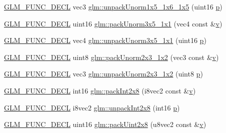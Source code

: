 \begin{DoxyCompactItemize}
\item 
\mbox{\hyperlink{setup_8hpp_ab2d052de21a70539923e9bcbf6e83a51}{G\+L\+M\+\_\+\+F\+U\+N\+C\+\_\+\+D\+E\+CL}} vec3 \mbox{\hyperlink{group__gtc__packing_ga6804d0525daf68bcac226f46fbb3b24e}{glm\+::unpack\+Unorm1x5\+\_\+1x6\+\_\+1x5}} (uint16 \mbox{\hyperlink{_s_d_l__opengl__glext_8h_aa5367c14d90f462230c2611b81b41d23}{p}})
\item 
\mbox{\hyperlink{setup_8hpp_ab2d052de21a70539923e9bcbf6e83a51}{G\+L\+M\+\_\+\+F\+U\+N\+C\+\_\+\+D\+E\+CL}} uint16 \mbox{\hyperlink{group__gtc__packing_ga1b41375846ed66768da78ca299d8d010}{glm\+::pack\+Unorm3x5\+\_\+1x1}} (vec4 const \&\mbox{\hyperlink{_s_d_l__opengl_8h_a10a82eabcb59d2fcd74acee063775f90}{v}})
\item 
\mbox{\hyperlink{setup_8hpp_ab2d052de21a70539923e9bcbf6e83a51}{G\+L\+M\+\_\+\+F\+U\+N\+C\+\_\+\+D\+E\+CL}} vec4 \mbox{\hyperlink{group__gtc__packing_gaab3b476e8f320670717fd518f350ce28}{glm\+::unpack\+Unorm3x5\+\_\+1x1}} (uint16 \mbox{\hyperlink{_s_d_l__opengl__glext_8h_aa5367c14d90f462230c2611b81b41d23}{p}})
\item 
\mbox{\hyperlink{setup_8hpp_ab2d052de21a70539923e9bcbf6e83a51}{G\+L\+M\+\_\+\+F\+U\+N\+C\+\_\+\+D\+E\+CL}} uint8 \mbox{\hyperlink{group__gtc__packing_ga0acca4eb99c300fe2edeef7ebd8fa08b}{glm\+::pack\+Unorm2x3\+\_\+1x2}} (vec3 const \&\mbox{\hyperlink{_s_d_l__opengl_8h_a10a82eabcb59d2fcd74acee063775f90}{v}})
\item 
\mbox{\hyperlink{setup_8hpp_ab2d052de21a70539923e9bcbf6e83a51}{G\+L\+M\+\_\+\+F\+U\+N\+C\+\_\+\+D\+E\+CL}} vec3 \mbox{\hyperlink{group__gtc__packing_gaeeacc5275329100c50fe8fc0871eb423}{glm\+::unpack\+Unorm2x3\+\_\+1x2}} (uint8 \mbox{\hyperlink{_s_d_l__opengl__glext_8h_aa5367c14d90f462230c2611b81b41d23}{p}})
\item 
\mbox{\hyperlink{setup_8hpp_ab2d052de21a70539923e9bcbf6e83a51}{G\+L\+M\+\_\+\+F\+U\+N\+C\+\_\+\+D\+E\+CL}} int16 \mbox{\hyperlink{group__gtc__packing_ga532b06d8915c6c65649f828e9106a1d9}{glm\+::pack\+Int2x8}} (i8vec2 const \&\mbox{\hyperlink{_s_d_l__opengl_8h_a10a82eabcb59d2fcd74acee063775f90}{v}})
\item 
\mbox{\hyperlink{setup_8hpp_ab2d052de21a70539923e9bcbf6e83a51}{G\+L\+M\+\_\+\+F\+U\+N\+C\+\_\+\+D\+E\+CL}} i8vec2 \mbox{\hyperlink{group__gtc__packing_ga55b4670bffab6ddb39d4a0fbf98718c1}{glm\+::unpack\+Int2x8}} (int16 \mbox{\hyperlink{_s_d_l__opengl__glext_8h_aa5367c14d90f462230c2611b81b41d23}{p}})
\item 
\mbox{\hyperlink{setup_8hpp_ab2d052de21a70539923e9bcbf6e83a51}{G\+L\+M\+\_\+\+F\+U\+N\+C\+\_\+\+D\+E\+CL}} uint16 \mbox{\hyperlink{group__gtc__packing_ga4a431a30aa5dfb425be3ea84fe561844}{glm\+::pack\+Uint2x8}} (u8vec2 const \&\mbox{\hyperlink{_s_d_l__opengl_8h_a10a82eabcb59d2fcd74acee063775f90}{v}})

\end{DoxyCompactItemize}
